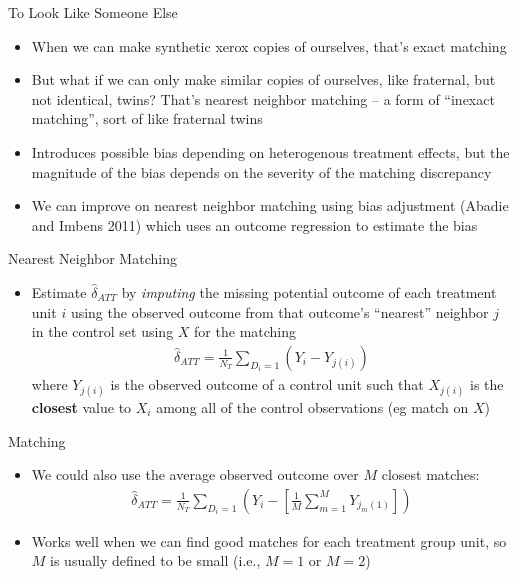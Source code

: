 \documentclass{beamer}
\begin{document}
\begin{frame}{To Look Like Someone Else}

\begin{itemize}
\item When we can make synthetic xerox copies of ourselves, that's exact matching
\item But what if we can only make similar copies of ourselves, like fraternal, but not identical, twins? That's nearest neighbor matching -- a form of ``inexact matching'', sort of like fraternal twins
\item Introduces possible bias depending on heterogenous treatment effects, but the magnitude of the bias depends on the severity of the matching discrepancy
\item We can improve on nearest neighbor matching using bias adjustment (Abadie and Imbens 2011) which uses an outcome regression to estimate the bias
\end{itemize}

\end{frame}

\begin{frame}{Nearest Neighbor Matching}
	
	\begin{itemize}
	\item Estimate $\widehat{\delta}_{ATT}$ by \emph{imputing} the missing potential outcome of each treatment unit $i$ using the observed outcome from that outcome's ``nearest'' neighbor $j$ in the control set using $X$ for the matching
		\begin{eqnarray*}
		\widehat{\delta}_{ATT} = \frac{1}{N_T}\sum_{D_i=1} (Y_i - Y_{j(i)})
		\end{eqnarray*}where $Y_{j(i)}$ is the observed outcome of a control unit such that $X_{j(i)}$ is the \textbf{closest} value to $X_i$ among all of the control observations (eg match on $X$)
	\end{itemize}
\end{frame}

\begin{frame}{Matching}
	
	\begin{itemize}
	\item We could also use the average observed outcome over $M$ closest matches:
		\begin{eqnarray*}
		\widehat{\delta}_{ATT} = \frac{1}{N_T}\sum_{D_i=1}\left(Y_i-\left[\frac{1}{M}\sum_{m=1}^MY_{j_m(1)}\right]\right)
		\end{eqnarray*}
	\item Works well when we can find good matches for each treatment group unit, so $M$ is usually defined to be small (i.e., $M=1$ or $M=2$)
	\end{itemize}
\end{frame}
\end{document}
